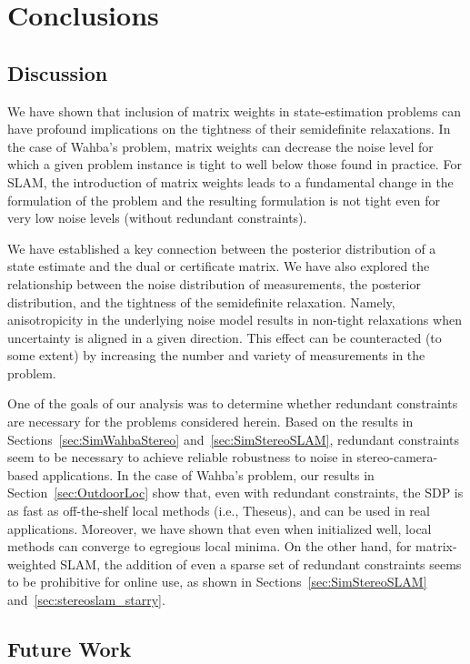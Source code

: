 \documentclass[lettersize,journal]{IEEEtran}
\begin{document}
\section{Conclusions}\label{sec:Conclusions}
\subsection{Discussion}
We have shown that inclusion of matrix weights in state-estimation problems can have profound implications on the tightness of their semidefinite relaxations. In the case of Wahba's problem, matrix weights can decrease the noise level for which a given problem instance is tight to well below those found in practice. For SLAM, the introduction of matrix weights leads to a fundamental change in the formulation of the problem and the resulting formulation is not tight even for very low noise levels (without redundant constraints). 

We have established a key connection between the posterior distribution of a state estimate and the dual or certificate matrix. We have also explored the relationship between the noise distribution of measurements, the posterior distribution, and the tightness of the semidefinite relaxation. Namely, anisotropicity in the underlying noise model results in non-tight relaxations when uncertainty is aligned in a given direction. This effect can be counteracted (to some extent) by increasing the number and variety of measurements in the problem.

One of the goals of our analysis was to determine whether redundant constraints are necessary for the problems considered herein. Based on the results in Sections~\ref{sec:SimWahbaStereo} and~\ref{sec:SimStereoSLAM}, redundant constraints seem to be necessary to achieve reliable robustness to noise in stereo-camera-based applications. In the case of Wahba's problem, our results in Section~\ref{sec:OutdoorLoc} show that, even with redundant constraints, the SDP is as fast as off-the-shelf local methods (i.e., Theseus), and can be used in real applications. Moreover, we have shown that even when initialized well, local methods can converge to egregious local minima. On the other hand, for matrix-weighted SLAM, the addition of even a sparse set of redundant constraints seems to be prohibitive for online use, as shown in Sections~\ref{sec:SimStereoSLAM} and~\ref{sec:stereoslam_starry}.

\subsection{Future Work}\label{sec:Future}
\end{document}
